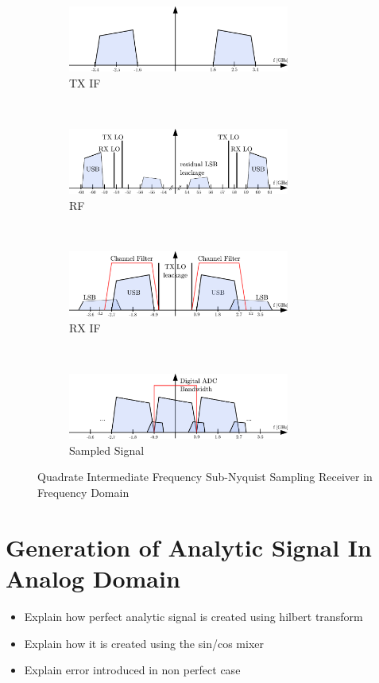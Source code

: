 \begin{figure}[ht]
  \begin{subfigure}{\textwidth}
    \centering
    \includegraphics[width=0.8\textwidth]{figures/rx_2_freq_tx_if}
    \caption{\gls{TX} \gls{IF}}
    \label{fig:rx_2_frq_tx_if}
  \end{subfigure}
  \vspace{4ex} \\
  \begin{subfigure}{\textwidth}
    \centering
    \includegraphics[width=0.8\textwidth]{figures/rx_2_freq_rf}
    \caption{\gls{RF}}
    \label{fig:rx_2_freq_rf}
  \end{subfigure}
  \vspace{4ex} \\
  \begin{subfigure}{\textwidth}
    \centering
    \includegraphics[width=0.8\textwidth]{figures/rx_2_freq_rx_if}
    \caption{\gls{RX} \gls{IF}}
    \label{fig:rx_2_freq_rx_if1}
  \end{subfigure}
  \vspace{4ex} \\
  \begin{subfigure}{\textwidth}
    \centering
    \includegraphics[width=0.8\textwidth]{figures/rx_2_freq_rx_adc}
    \caption{Sampled Signal}
    \label{fig:rx_2_freq_rx_if2}
  \end{subfigure}
  \caption{Quadrate Intermediate Frequency Sub-Nyquist Sampling Receiver
    in Frequency Domain}
  \label{fig:rx_2_freq}
\end{figure}

\section{Generation of Analytic Signal In Analog Domain}
\begin{itemize}
\item Explain how perfect analytic signal is created using hilbert transform
\item Explain how it is created using the sin/cos mixer
\item Explain error introduced in non perfect case
\end{itemize}
